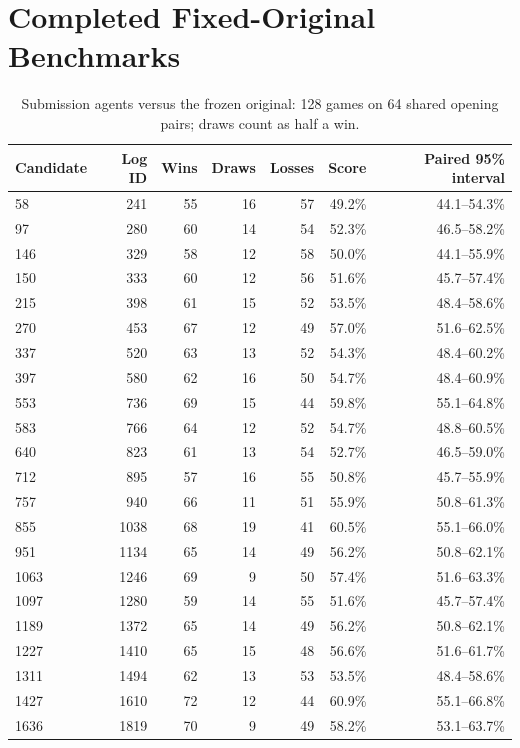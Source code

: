 \documentclass[letterpaper]{article}
\begin{document}
\clearpage
\section{Completed Fixed-Original Benchmarks}
\label{app:benchmarks}
\begin{table}[htbp]
\centering\small
\caption{Submission agents versus the frozen original: 128 games on 64 shared
opening pairs; draws count as half a win.}
\begin{tabular}{@{}lrrrrrr@{}}
\toprule
Candidate & Log ID & Wins & Draws & Losses & Score & Paired 95\% interval\\
\midrule
58 & 241 & 55 & 16 & 57 & 49.2\% & 44.1--54.3\%\\
97 & 280 & 60 & 14 & 54 & 52.3\% & 46.5--58.2\%\\
146 & 329 & 58 & 12 & 58 & 50.0\% & 44.1--55.9\%\\
150 & 333 & 60 & 12 & 56 & 51.6\% & 45.7--57.4\%\\
215 & 398 & 61 & 15 & 52 & 53.5\% & 48.4--58.6\%\\
270 & 453 & 67 & 12 & 49 & 57.0\% & 51.6--62.5\%\\
337 & 520 & 63 & 13 & 52 & 54.3\% & 48.4--60.2\%\\
397 & 580 & 62 & 16 & 50 & 54.7\% & 48.4--60.9\%\\
553 & 736 & 69 & 15 & 44 & 59.8\% & 55.1--64.8\%\\
583 & 766 & 64 & 12 & 52 & 54.7\% & 48.8--60.5\%\\
640 & 823 & 61 & 13 & 54 & 52.7\% & 46.5--59.0\%\\
712 & 895 & 57 & 16 & 55 & 50.8\% & 45.7--55.9\%\\
757 & 940 & 66 & 11 & 51 & 55.9\% & 50.8--61.3\%\\
855 & 1038 & 68 & 19 & 41 & 60.5\% & 55.1--66.0\%\\
951 & 1134 & 65 & 14 & 49 & 56.2\% & 50.8--62.1\%\\
1063 & 1246 & 69 & 9 & 50 & 57.4\% & 51.6--63.3\%\\
1097 & 1280 & 59 & 14 & 55 & 51.6\% & 45.7--57.4\%\\
1189 & 1372 & 65 & 14 & 49 & 56.2\% & 50.8--62.1\%\\
1227 & 1410 & 65 & 15 & 48 & 56.6\% & 51.6--61.7\%\\
1311 & 1494 & 62 & 13 & 53 & 53.5\% & 48.4--58.6\%\\
1427 & 1610 & 72 & 12 & 44 & 60.9\% & 55.1--66.8\%\\
1636 & 1819 & 70 & 9 & 49 & 58.2\% & 53.1--63.7\%\\

\end{tabular}
\end{table}
\end{document}
